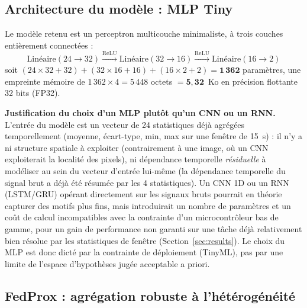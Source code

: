 \documentclass{acmart}
\begin{document}
\subsection{Architecture du modèle : MLP Tiny}
\label{subsec:model}

Le modèle retenu est un perceptron multicouche minimaliste, à trois couches
entièrement connectées :
\begin{equation}
  \text{Lin\'eaire}(24 \to 32) \xrightarrow{\text{ReLU}}
  \text{Lin\'eaire}(32 \to 16) \xrightarrow{\text{ReLU}}
  \text{Lin\'eaire}(16 \to 2)
  \label{eq:mlp}
\end{equation}
soit $(24{\times}32{+}32) + (32{\times}16{+}16) + (16{\times}2{+}2) =
\mathbf{1\,362}$ paramètres, une empreinte mémoire de $1\,362 \times 4 =
5\,448$ octets $= \mathbf{5{,}32}$~Ko en précision flottante 32 bits (FP32).

\textbf{Justification du choix d'un MLP plutôt qu'un CNN ou un RNN.} L'entrée
du modèle est un vecteur de 24 statistiques déjà agrégées temporellement
(moyenne, écart-type, min, max sur une fenêtre de 15~s) : il n'y a ni
structure spatiale à exploiter (contrairement à une image, où un CNN
exploiterait la localité des pixels), ni dépendance temporelle
\emph{résiduelle} à modéliser au sein du vecteur d'entrée lui-même (la
dépendance temporelle du signal brut a déjà été résumée par les 4
statistiques). Un CNN 1D ou un RNN (LSTM/GRU) opérant directement sur les
signaux bruts pourrait en théorie capturer des motifs plus fins, mais
introduirait un nombre de paramètres et un coût de calcul incompatibles avec
la contrainte d'un microcontrôleur bas de gamme, pour un gain de performance
non garanti sur une tâche déjà relativement bien résolue par les statistiques
de fenêtre (Section~\ref{sec:results}). Le choix du MLP est donc dicté par la
contrainte de déploiement (TinyML), pas par une limite de l'espace
d'hypothèses jugée acceptable a priori.

\subsection{FedProx : agrégation robuste à l'hétérogénéité}
\label{subsec:fedprox}
\end{document}
